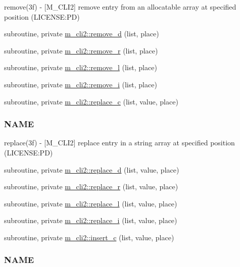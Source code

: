 \begin{DoxyCompactItemize}
\begin{DoxyCompactList}
remove(3f) -\/ \mbox{[}M\+\_\+\+C\+L\+I2\mbox{]} remove entry from an allocatable array at specified position (L\+I\+C\+E\+N\+SE\+:PD) \end{DoxyCompactList}\item 
subroutine, private \mbox{\hyperlink{namespacem__cli2_a5deb6a427a39e04c5a18a82497d5cf84}{m\+\_\+cli2\+::remove\+\_\+d}} (list, place)
\item 
subroutine, private \mbox{\hyperlink{namespacem__cli2_a281edafaa6f74c30bd8de6d0c1d05be6}{m\+\_\+cli2\+::remove\+\_\+r}} (list, place)
\item 
subroutine, private \mbox{\hyperlink{namespacem__cli2_ae3fc38d25a8a4892bde95a7198c2495a}{m\+\_\+cli2\+::remove\+\_\+l}} (list, place)
\item 
subroutine, private \mbox{\hyperlink{namespacem__cli2_a1c2bd26b3c04a499cc65b00133dfe6b9}{m\+\_\+cli2\+::remove\+\_\+i}} (list, place)
\item 
subroutine, private \mbox{\hyperlink{namespacem__cli2_affd644ac84d1010b40748f80d142d6b3}{m\+\_\+cli2\+::replace\+\_\+c}} (list, value, place)
\begin{DoxyCompactList}\small\item\em \subsubsection*{N\+A\+ME}

replace(3f) -\/ \mbox{[}M\+\_\+\+C\+L\+I2\mbox{]} replace entry in a string array at specified position (L\+I\+C\+E\+N\+SE\+:PD) \end{DoxyCompactList}\item 
subroutine, private \mbox{\hyperlink{namespacem__cli2_ac327823dd714cd4c1667666158f0c135}{m\+\_\+cli2\+::replace\+\_\+d}} (list, value, place)
\item 
subroutine, private \mbox{\hyperlink{namespacem__cli2_abe681a8b55ae238b029766713a79210a}{m\+\_\+cli2\+::replace\+\_\+r}} (list, value, place)
\item 
subroutine, private \mbox{\hyperlink{namespacem__cli2_ae4a1802207f6b67e36cbf89003d6fb55}{m\+\_\+cli2\+::replace\+\_\+l}} (list, value, place)
\item 
subroutine, private \mbox{\hyperlink{namespacem__cli2_a0a591fd55e8010f26eb6f9f6bafc1ddb}{m\+\_\+cli2\+::replace\+\_\+i}} (list, value, place)
\item 
subroutine, private \mbox{\hyperlink{namespacem__cli2_ab3f2aa827b3b7ff419bcdc3ccb2672b3}{m\+\_\+cli2\+::insert\+\_\+c}} (list, value, place)
\begin{DoxyCompactList}\small\item\em \subsubsection*{N\+A\+ME}


\end{DoxyCompactList}
\end{DoxyCompactItemize}
